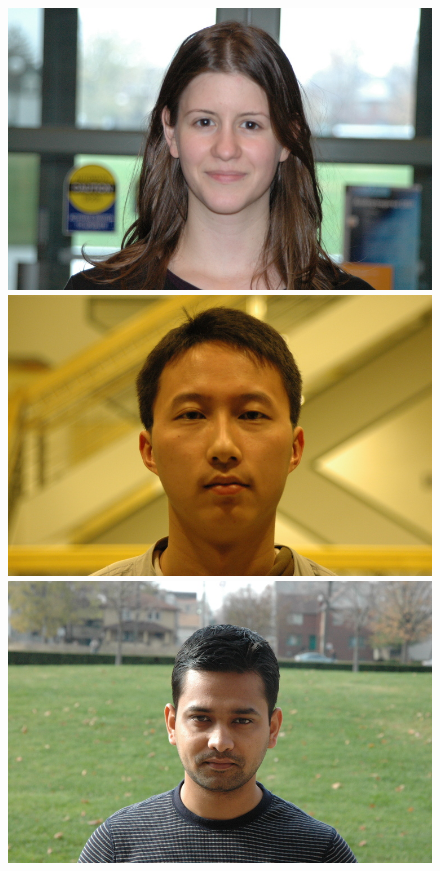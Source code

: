 \begin{figure}
\centering
\includegraphics[scale=0.35,clip=true]{figures_cvpr/examples/1/DSC_1319.jpg} 
\includegraphics[scale=0.35,clip=true]{figures_cvpr/examples/1/DSC_1531.jpg} 
\includegraphics[scale=0.35,clip=true]{figures_cvpr/examples/1/DSC_1574.jpg} 

\end{figure}
